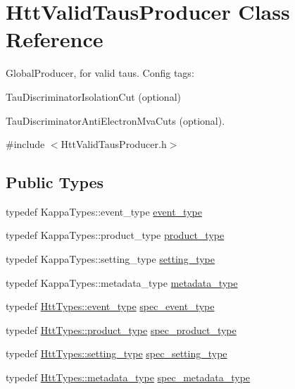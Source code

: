 \hypertarget{classHttValidTausProducer}{
\section{HttValidTausProducer Class Reference}
\label{classHttValidTausProducer}
}


GlobalProducer, for valid taus. Config tags:
\begin{DoxyItemize}
\item TauDiscriminatorIsolationCut (optional)
\item TauDiscriminatorAntiElectronMvaCuts (optional). 
\end{DoxyItemize} 


{\ttfamily \#include $<$HttValidTausProducer.h$>$}\subsection*{Public Types}
\begin{DoxyCompactItemize}
\item 
typedef KappaTypes::event\_\-type \hyperlink{classHttValidTausProducer_a3e20ad88591457e5cf707cf5992172ef}{event\_\-type}
\item 
typedef KappaTypes::product\_\-type \hyperlink{classHttValidTausProducer_a2a44fcab8ebc0f3bf907f4afcaaf3406}{product\_\-type}
\item 
typedef KappaTypes::setting\_\-type \hyperlink{classHttValidTausProducer_a3c2e1acc4286eebbcdd76620d3f1fea7}{setting\_\-type}
\item 
typedef KappaTypes::metadata\_\-type \hyperlink{classHttValidTausProducer_a6802826faf081861b7b2f89a8331a4a2}{metadata\_\-type}
\item 
typedef \hyperlink{classHttEvent}{HttTypes::event\_\-type} \hyperlink{classHttValidTausProducer_ac1f2980f856309ed6b75b2ff04faabcf}{spec\_\-event\_\-type}
\item 
typedef \hyperlink{classHttProduct}{HttTypes::product\_\-type} \hyperlink{classHttValidTausProducer_a4d9d0f3fe36acbe3b45777615dd56e05}{spec\_\-product\_\-type}
\item 
typedef \hyperlink{classHttSettings}{HttTypes::setting\_\-type} \hyperlink{classHttValidTausProducer_a85c4e57669dd7730e2a88a2be2af270d}{spec\_\-setting\_\-type}
\item 
typedef \hyperlink{classHttMetadata}{HttTypes::metadata\_\-type} \hyperlink{classHttValidTausProducer_a1fd6f02a13e937383c53a6c1ccc7781b}{spec\_\-metadata\_\-type}
\end{DoxyCompactItemize}
